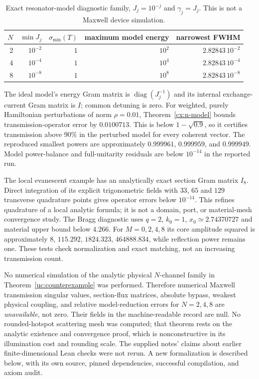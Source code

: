 \begin{table}[ht]
\centering
\caption{Exact resonator-model diagnostic family, $J_j=10^{-j}$ and
$\gamma_j=J_j$. This is not a Maxwell device simulation.}
\label{ver:model-table}
\begin{tabular}{@{}rrrrr@{}}\toprule
$N$ & $\min J_j$ & $\sigma_{\min}(T)$ & maximum model energy & narrowest FWHM\\\midrule
2 & $10^{-2}$ & $1$ & $10^2$ & $2.82843\,10^{-2}$\\
4 & $10^{-4}$ & $1$ & $10^4$ & $2.82843\,10^{-4}$\\
8 & $10^{-8}$ & $1$ & $10^8$ & $2.82843\,10^{-8}$\\\bottomrule
\end{tabular}
\end{table}
The ideal model's energy Gram matrix is $\operatorname{diag}(J_j^{-1})$
and its internal exchange-current Gram matrix is $I$; common detuning is
zero. For weighted, purely Hamiltonian perturbations of norm $\rho=0.01$,
Theorem~\ref{cx:n-model} bounds transmission-operator error by
$0.0100713$. This is below $1-\sqrt{0.9}$, so it certifies transmission
above $90\%$ in the perturbed model for every coherent vector. The
reproduced smallest powers are approximately $0.999961$, $0.999959$, and
$0.999949$. Model power-balance and full-unitarity residuals are below
$10^{-14}$ in the reported run.

The local evanescent example has an analytically exact section Gram matrix
$I_8$. Direct integration of its explicit trigonometric fields with
$33$, $65$ and $129$ transverse quadrature points gives operator errors
below $10^{-14}$. This refines quadrature of a local analytic formula; it
is not a domain, port, or material-mesh convergence study. The Bragg
diagnostic uses $q=2$, $k_0=1$, $x_0\simeq2.74370727$ and material upper
bound below $4.266$. For $M=0,2,4,8$ its core amplitude squared is
approximately $8$, $115.292$, $1824.323$, $464888.834$, while reflection
power remains one. These tests check normalization and exact matching,
not an increasing transmission count.

No numerical simulation of the analytic physical $N$-channel family in
Theorem~\ref{uc:counterexample} was performed. Therefore numerical
Maxwell transmission singular values, section-flux matrices, absolute
bypass, weakest physical coupling, and relative model-reduction errors
for $N=2,4,8$ are \emph{unavailable}, not zero. Their fields in the
machine-readable record are null. No rounded-hotspot scattering mesh was
computed; that theorem rests on the analytic existence and convergence
proof, which is nonconstructive in its illumination cost and rounding
scale. The supplied notes' claims about earlier finite-dimensional Lean
checks were not rerun. A new formalization is described below, with its
own source, pinned dependencies, successful compilation, and axiom audit.

